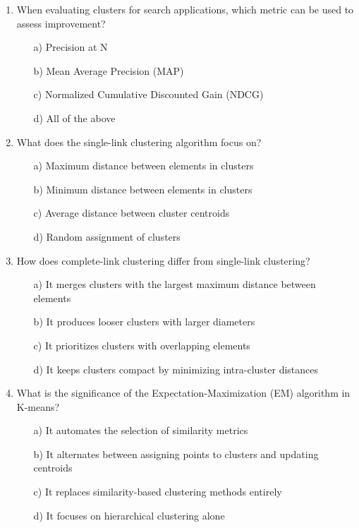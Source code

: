 \documentclass[8pt]{extarticle}
\begin{document}
\begin{multicols}{2}
\begin{enumerate}
\item When evaluating clusters for search applications, which metric can be used to assess improvement?
\begin{itemize}
\item[a)] Precision at N
\item[b)] Mean Average Precision (MAP)
\item[c)] Normalized Cumulative Discounted Gain (NDCG)
\item[d)] All of the above
\end{itemize}

\item What does the single-link clustering algorithm focus on?
\begin{itemize}
\item[a)] Maximum distance between elements in clusters
\item[b)] Minimum distance between elements in clusters
\item[c)] Average distance between cluster centroids
\item[d)] Random assignment of clusters
\end{itemize}

\item How does complete-link clustering differ from single-link clustering?
\begin{itemize}
\item[a)] It merges clusters with the largest maximum distance between elements
\item[b)] It produces looser clusters with larger diameters
\item[c)] It prioritizes clusters with overlapping elements
\item[d)] It keeps clusters compact by minimizing intra-cluster distances
\end{itemize}

\item What is the significance of the Expectation-Maximization (EM) algorithm in K-means?
\begin{itemize}
\item[a)] It automates the selection of similarity metrics
\item[b)] It alternates between assigning points to clusters and updating centroids
\item[c)] It replaces similarity-based clustering methods entirely
\item[d)] It focuses on hierarchical clustering alone
\end{itemize}


\end{enumerate}
\end{multicols}
\end{document}
